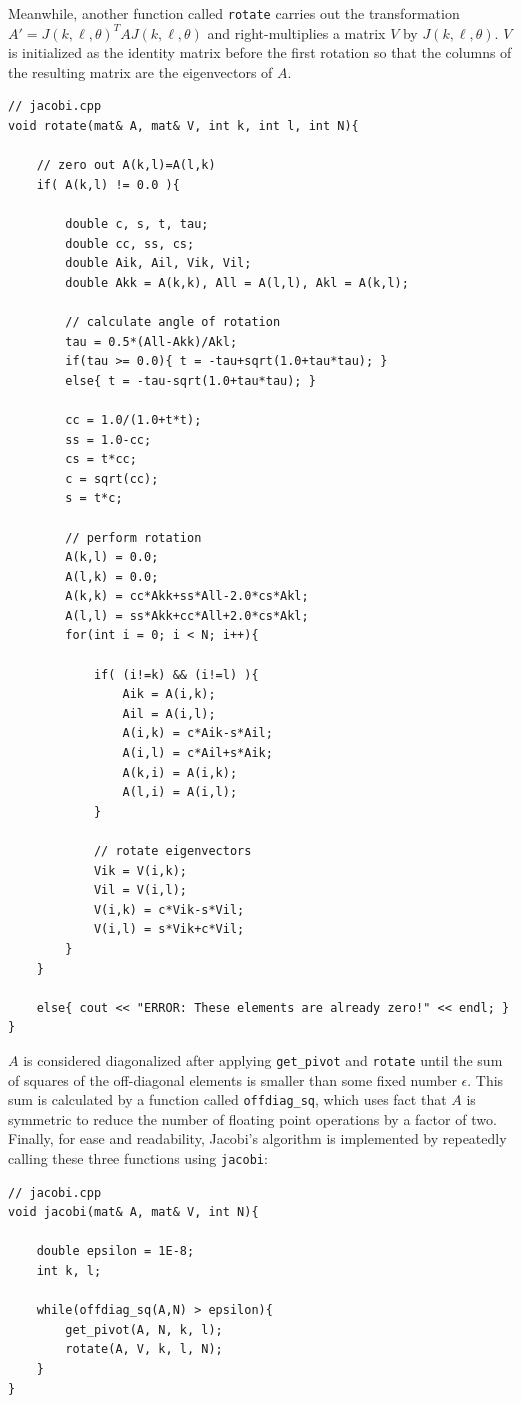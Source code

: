\documentclass[prb,aps,twocolumn,showpacs,10pt]{revtex4-1}
\begin{document}
\noindent Meanwhile, another function called \texttt{rotate} carries out the transformation $A'=J(k,\ell,\theta)^TAJ(k,\ell,\theta)$ and right-multiplies a matrix $V$ by $J(k,\ell,\theta)$. $V$ is initialized as the identity matrix before the first rotation so that the columns of the resulting matrix are the eigenvectors of $A$. 

\begin{lstlisting}
// jacobi.cpp
void rotate(mat& A, mat& V, int k, int l, int N){

	// zero out A(k,l)=A(l,k)
	if( A(k,l) != 0.0 ){

		double c, s, t, tau;
		double cc, ss, cs;
		double Aik, Ail, Vik, Vil;
		double Akk = A(k,k), All = A(l,l), Akl = A(k,l);

		// calculate angle of rotation
		tau = 0.5*(All-Akk)/Akl;
		if(tau >= 0.0){ t = -tau+sqrt(1.0+tau*tau); }
		else{ t = -tau-sqrt(1.0+tau*tau); }

		cc = 1.0/(1.0+t*t);
		ss = 1.0-cc;
		cs = t*cc;
		c = sqrt(cc);
		s = t*c;

		// perform rotation
		A(k,l) = 0.0;
		A(l,k) = 0.0;
		A(k,k) = cc*Akk+ss*All-2.0*cs*Akl;
		A(l,l) = ss*Akk+cc*All+2.0*cs*Akl;
		for(int i = 0; i < N; i++){

			if( (i!=k) && (i!=l) ){
				Aik = A(i,k);
				Ail = A(i,l);
				A(i,k) = c*Aik-s*Ail;
				A(i,l) = c*Ail+s*Aik;
				A(k,i) = A(i,k);
				A(l,i) = A(i,l);
			}

			// rotate eigenvectors 
			Vik = V(i,k);
			Vil = V(i,l);
			V(i,k) = c*Vik-s*Vil;
			V(i,l) = s*Vik+c*Vil;
		}
	}

	else{ cout << "ERROR: These elements are already zero!" << endl; } 
}
\end{lstlisting}

\noindent $A$ is considered diagonalized after applying \texttt{get\_pivot} and \texttt{rotate} until the sum of squares of the off-diagonal elements is smaller than some fixed number $\epsilon$. This sum is calculated by a function called \texttt{offdiag\_sq}, which uses fact that $A$ is symmetric to reduce the number of floating point operations by a factor of two. Finally, for ease and readability, Jacobi's algorithm is implemented by repeatedly calling these three functions using \texttt{jacobi}:

\begin{lstlisting}
// jacobi.cpp 
void jacobi(mat& A, mat& V, int N){

	double epsilon = 1E-8;
	int k, l;

	while(offdiag_sq(A,N) > epsilon){
		get_pivot(A, N, k, l);
		rotate(A, V, k, l, N);
	}
}
\end{lstlisting}
\end{document}
